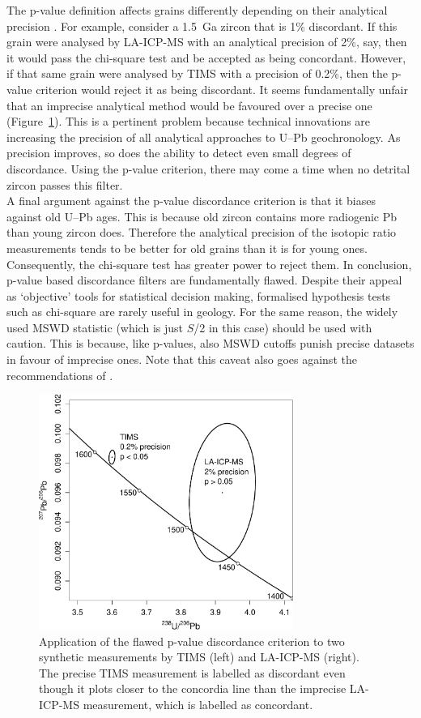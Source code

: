 \documentclass[gchron, manuscript]{copernicus}
\begin{document}
The p-value definition affects grains differently depending on their
analytical precision \citep{nemchin2005}. For example, consider a
1.5~Ga zircon that is 1\% discordant. If this grain were analysed by
LA-ICP-MS with an analytical precision of 2\%, say, then it would pass
the chi-square test and be accepted as being concordant. However, if
that same grain were analysed by TIMS with a precision of 0.2\%, then
the p-value criterion would reject it as being discordant. It seems
fundamentally unfair that an imprecise analytical method would be
favoured over a precise one (Figure~\ref{fig:TIMSvsLAICPMS}). This is
a pertinent problem because technical innovations are increasing the
precision of all analytical approaches to U--Pb geochronology.  As
precision improves, so does the ability to detect even small degrees
of discordance. Using the p-value criterion, there may come a time
when no detrital zircon passes this filter.\\

A final argument against the p-value discordance criterion is that it
biases against old U--Pb ages. This is because old zircon contains
more radiogenic Pb than young zircon does. Therefore the analytical
precision of the isotopic ratio measurements tends to be better for
old grains than it is for young ones. Consequently, the chi-square
test has greater power \citep[\emph{sensu}][]{cohen1992} to reject
them. In conclusion, p-value based discordance filters are
fundamentally flawed. Despite their appeal as `objective' tools for
statistical decision making, formalised hypothesis tests such as
chi-square are rarely useful in geology. For the same reason, the
widely used MSWD \citep[Mean Square of the Weighted
  Deviates,][]{mcintyre1966} statistic (which is just $S$/2 in this
case) should be used with caution. This is because, like p-values,
also MSWD cutoffs punish precise datasets in favour of imprecise
ones. Note that this caveat also goes against the recommendations of
\citet{spencer2016}.

\begin{figure}
  \includegraphics[width=8.3cm]{TIMSvsICPMS.pdf}
  \caption{Application of the flawed p-value discordance criterion
    to two synthetic measurements by TIMS (left) and LA-ICP-MS
    (right).  The precise TIMS measurement is labelled as discordant
    even though it plots closer to the concordia line than the
    imprecise LA-ICP-MS measurement, which is labelled as
    concordant.
  }
  \label{fig:TIMSvsLAICPMS}
\end{figure}
\end{document}
